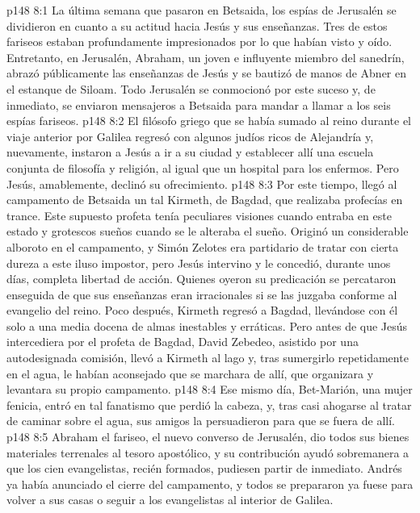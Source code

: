 \vs p148 8:1 La última semana que pasaron en Betsaida, los espías de Jerusalén se dividieron en cuanto a su actitud hacia Jesús y sus enseñanzas. Tres de estos fariseos estaban profundamente impresionados por lo que habían visto y oído. Entretanto, en Jerusalén, Abraham, un joven e influyente miembro del sanedrín, abrazó públicamente las enseñanzas de Jesús y se bautizó de manos de Abner en el estanque de Siloam. Todo Jerusalén se conmocionó por este suceso y, de inmediato, se enviaron mensajeros a Betsaida para mandar a llamar a los seis espías fariseos.
\vs p148 8:2 \pc El filósofo griego que se había sumado al reino durante el viaje anterior por Galilea regresó con algunos judíos ricos de Alejandría y, nuevamente, instaron a Jesús a ir a su ciudad y establecer allí una escuela conjunta de filosofía y religión, al igual que un hospital para los enfermos. Pero Jesús, amablemente, declinó su ofrecimiento.
\vs p148 8:3 \pc Por este tiempo, llegó al campamento de Betsaida un tal Kirmeth, de Bagdad, que realizaba profecías en trance. Este supuesto profeta tenía peculiares visiones cuando entraba en este estado y grotescos sueños cuando se le alteraba el sueño. Originó un considerable alboroto en el campamento, y Simón Zelotes era partidario de tratar con cierta dureza a este iluso impostor, pero Jesús intervino y le concedió, durante unos días, completa libertad de acción. Quienes oyeron su predicación se percataron enseguida de que sus enseñanzas eran irracionales si se las juzgaba conforme al evangelio del reino. Poco después, Kirmeth regresó a Bagdad, llevándose con él solo a una media docena de almas inestables y erráticas. Pero antes de que Jesús intercediera por el profeta de Bagdad, David Zebedeo, asistido por una autodesignada comisión, llevó a Kirmeth al lago y, tras sumergirlo repetidamente en el agua, le habían aconsejado que se marchara de allí, que organizara y levantara su propio campamento.
\vs p148 8:4 \pc Ese mismo día, Bet\hyp{}Marión, una mujer fenicia, entró en tal fanatismo que perdió la cabeza, y, tras casi ahogarse al tratar de caminar sobre el agua, sus amigos la persuadieron para que se fuera de allí.
\vs p148 8:5 \pc Abraham el fariseo, el nuevo converso de Jerusalén, dio todos sus bienes materiales terrenales al tesoro apostólico, y su contribución ayudó sobremanera a que los cien evangelistas, recién formados, pudiesen partir de inmediato. Andrés ya había anunciado el cierre del campamento, y todos se prepararon ya fuese para volver a sus casas o seguir a los evangelistas al interior de Galilea.
